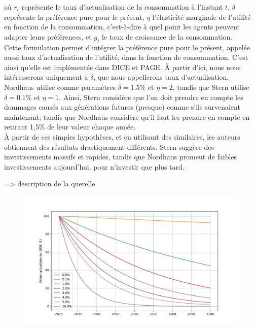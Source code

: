 où $r_t$ représente le taux d'actualisation de la consommation à l'instant $t$, $\delta$ représente la préférence pure pour le présent, $\eta$ l'élasticité marginale de l'utilité en fonction de la consommation, c'est-à-dire à quel point les agents peuvent adapter leurs préférences,  et $g_t$ le taux de croissance de la consommation. \\

Cette formulation permet d'intégrer la préférence pure pour le présent, appelée aussi taux d'actualisation de l'utilité, dans la fonction de consommation. C'est ainsi qu'elle est implémentée dans DICE et PAGE. À partir d'ici, nous nous intéresserons uniquement à $\delta$, que nous appellerons taux d'actualisation. \\

Nordhaus utilise comme paramètres $\delta = 1.5\%$ et $\eta=2$, tandis que Stern utilise $\delta=0.1\%$ et $\eta=1$. Ainsi, Stern considère que l'on doit prendre en compte les dommages causés aux générations futures (presque) comme s'ils survenaient maintenant; tandis que Nordhaus considère qu'il faut les prendre en compte en retirant 1,5\% de leur valeur chaque année. \\

À partir de ces simples hypothèses, et en utilisant des similaires, les auteurs obtiennent des résultats drastiquement différents. Stern suggère des investissements massifs et rapides, tandis que Nordhaus promeut de faibles investissements aujourd'hui, pour n'investir que plus tard. 

\cite{guigourez_10_2023} => description de la querelle

\begin{figure}
    \centering
    \includegraphics[width=\linewidth]{results/actualisation.png}
    \label{fig:discount-rate}
\end{figure}

